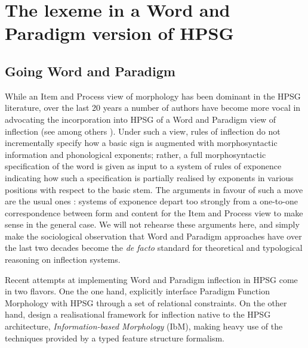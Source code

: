 \documentclass[output=paper]{langsci/langscibook}
\begin{document}
\section{The lexeme in a Word and Paradigm version of HPSG}
\label{sec:2}

\subsection{Going Word and Paradigm}



While an Item and Process view of morphology has been dominant in the
HPSG literature, over the last 20 years a number of authors have
become more vocal in advocating the incorporation into HPSG of a Word
and Paradigm view of inflection (see
among others \citealt{Erjavec94,Miller97,Ackerman98,Crysmann02,Bonami06,Bonami13,bonami2015,Bonami15,Crysmann14}). Under
such a view, rules of inflection do not incrementally specify how a
basic sign is augmented with morphosyntactic information and
phonological exponents; rather, a full morphosyntactic specification
of the word is given as input to a system of rules of exponence
indicating how such a specification is partially realised by exponents
in various positions with respect to the basic stem. The arguments in
favour of such a move are the usual ones
\citep{Matthews74,Zwicky85,Anderson92,Stump01,Brown12}: systems of
exponence depart too strongly from a one-to-one correspondence between
form and content for the Item and Process view to make sense in the
general case. We will not rehearse these arguments here, and simply
make the sociological observation that Word and Paradigm approaches
have over the last two decades become the \emph{de facto} standard for
theoretical and typological reasoning on inflection systems.

Recent attempts at implementing Word and Paradigm inflection in HPSG
come in two flavors. One the one hand,
\citet{Bonami13,bonami2015,Bonami15} explicitly interface Paradigm
Function Morphology \citep{Stump01,Stump16} with HPSG through a set of
relational constraints. On the other hand, \citet{Crysmann14} design a
realisational framework for inflection native to the HPSG
architecture, \emph{Information-based Morphology} (IbM), making heavy
use of the  techniques provided by a typed feature
structure formalism.
\end{document}
